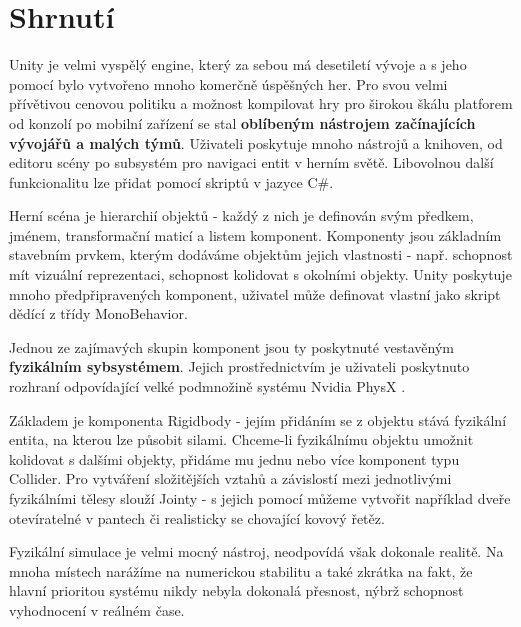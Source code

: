 \section{Shrnutí}

Unity je velmi vyspělý engine, který za sebou má desetiletí vývoje a s jeho pomocí bylo vytvořeno mnoho komerčně úspěšných her. Pro svou velmi přívětivou cenovou politiku a možnost kompilovat hry pro širokou škálu platforem od konzolí po mobilní zařízení se stal \textbf{oblíbeným nástrojem začínajících vývojářů a malých týmů}. Uživateli poskytuje mnoho nástrojů a knihoven, od editoru scény po subsystém pro navigaci entit v herním světě. Libovolnou další funkcionalitu lze přidat pomocí skriptů v jazyce C\#. 

Herní scéna je hierarchií objektů - každý z nich je definován svým předkem, jménem, transformační maticí a listem komponent. Komponenty jsou základním stavebním prvkem, kterým dodáváme objektům jejich vlastnosti - např. schopnost mít vizuální reprezentaci, schopnost kolidovat s okolními objekty. Unity poskytuje mnoho předpřipravených komponent, uživatel může definovat vlastní jako skript dědící z třídy MonoBehavior.

Jednou ze zajímavých skupin komponent jsou ty poskytnuté vestavěným \textbf{fyzikálním sybsystémem}. Jejich prostřednictvím je uživateli poskytnuto rozhraní odpovídající velké podmnožině systému Nvidia PhysX \cite{PhysX}. 

Základem je komponenta Rigidbody - jejím přidáním se z objektu stává fyzikální entita, na kterou lze působit silami. Chceme-li fyzikálnímu objektu umožnit kolidovat s dalšími objekty, přidáme mu jednu nebo více komponent typu Collider. Pro vytváření složitějších vztahů a závislostí mezi jednotlivými fyzikálními tělesy slouží Jointy - s jejich pomocí můžeme vytvořit například dveře otevíratelné v pantech či realisticky se chovající kovový řetěz.

Fyzikální simulace je velmi mocný nástroj, neodpovídá však dokonale realitě. Na mnoha místech narážíme na numerickou stabilitu a také zkrátka na fakt, že hlavní prioritou systému nikdy nebyla dokonalá přesnost, nýbrž schopnost vyhodnocení v reálném čase.
